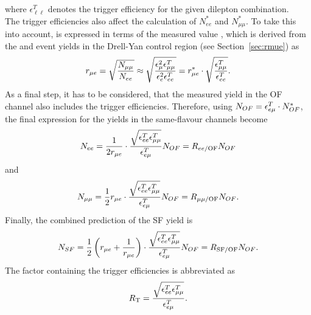 where $\epsilon_{\ell\ell}^T$ denotes the trigger efficiency for the given dilepton combination.\\
The trigger efficiencies also affect the calculation of $N_{ee}^{*}$ and $N_{\mu\mu}^{*}$. To take this into account, \rmuestar is expressed in terms of the measured value \rmue, which is derived from the \EE and \MM event yields in the Drell-Yan control region (see Section~\ref{sec:rmue}) as 
\begin{equation}
r_{\mu e}  = \sqrt{\frac{N_{\mu\mu}}{N_{ee}}} \approx \sqrt{\frac{\epsilon_{\mu}^2 \epsilon_{\mu\mu}^T}{\epsilon_{e}^2 \epsilon_{ee}^T}} = r_{\mu e}^{*} \cdot \sqrt{\frac{\epsilon_{\mu\mu}^T}{\epsilon_{ee}^T}}.
\end{equation}
As a final step, it has to be considered, that the measured yield in the OF channel also includes the trigger efficiencies. Therefore, using $N_{OF} = \epsilon_{e\mu}^T \cdot N_{OF}^{*}$, the final expression for the yields in the same-flavour channels become
\begin{equation}
N_{ee} = \frac{1}{2r_{\mu e}} \cdot \frac{\sqrt{\epsilon_{ee}^T \epsilon_{\mu\mu}^T}}{\epsilon_{e\mu}^T} N_{OF} = R_\text{$ee$/OF} N_{OF}
\label{eq:nee}
\end{equation} 
and
\begin{equation}
N_{\mu\mu} = \frac{1}{2}r_{\mu e}  \cdot \frac{\sqrt{\epsilon_{ee}^T \epsilon_{\mu\mu}^T}}{\epsilon_{e\mu}^T} N_{OF} = R_\text{$\mu\mu$/OF} N_{OF}.
\label{eq:nmm}
\end{equation} 
Finally, the combined prediction of the SF yield is
\begin{equation}
N_{SF} = \frac{1}{2}\left(r_{\mu e} + \frac{1}{r_{\mu e}}\right) \cdot \frac{\sqrt{\epsilon_{ee}^T \epsilon_{\mu\mu}^T}}{\epsilon_{e\mu}^T}  N_{OF} = R_{\text{SF/OF}} N_{OF}.
\label{eq:nsf}
\end{equation}
The factor containing the trigger efficiencies is abbreviated as
\begin{equation}
R_{\mathrm{T}} = \frac{\sqrt{\epsilon_{ee}^T \epsilon_{\mu\mu}^T}}{\epsilon_{e\mu}^T}.
\label{eq:RT}
\end{equation}
